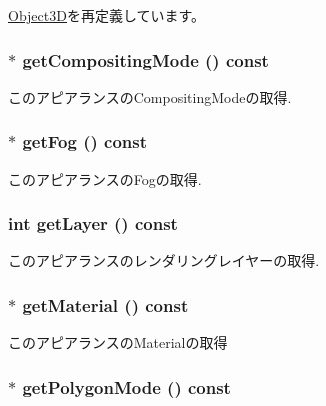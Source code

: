 \hyperlink{classm3g_1_1Object3D_4dadb21b568b0230fac106f15040138c}{Object3D}を再定義しています。\hypertarget{classm3g_1_1Appearance_e4045934febb56891c15e14486b239a8}{
\subsubsection[{getCompositingMode}]{ $\ast$ getCompositingMode () const}}
\label{classm3g_1_1Appearance_e4045934febb56891c15e14486b239a8}


このアピアランスのCompositingModeの取得. \hypertarget{classm3g_1_1Appearance_93143a921b998ff69576147a59eb44d4}{
\subsubsection[{getFog}]{ $\ast$ getFog () const}}
\label{classm3g_1_1Appearance_93143a921b998ff69576147a59eb44d4}


このアピアランスのFogの取得. \hypertarget{classm3g_1_1Appearance_df831e0e0ebf9d7e997150e497e6a6cf}{
\subsubsection[{getLayer}]{\setlength{\rightskip}{0pt plus 5cm}int getLayer () const}}
\label{classm3g_1_1Appearance_df831e0e0ebf9d7e997150e497e6a6cf}


このアピアランスのレンダリングレイヤーの取得. \hypertarget{classm3g_1_1Appearance_a412c7074ed5d51f6b8b6fd89275c405}{
\subsubsection[{getMaterial}]{ $\ast$ getMaterial () const}}
\label{classm3g_1_1Appearance_a412c7074ed5d51f6b8b6fd89275c405}


このアピアランスのMaterialの取得 \hypertarget{classm3g_1_1Appearance_dd3ddcefcd18339150d281b155602886}{
\subsubsection[{getPolygonMode}]{ $\ast$ getPolygonMode () const}}
\label{classm3g_1_1Appearance_dd3ddcefcd18339150d281b155602886}


